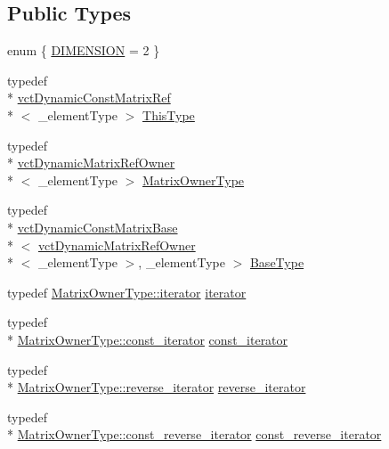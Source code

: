 \subsection*{Public Types}
\begin{DoxyCompactItemize}
\item 
enum \{ \hyperlink{classvct_dynamic_const_matrix_ref_a79a3214fbb027346f5ba60336c95c1faa078cb772f47aba74a3233d177914f8fa}{D\-I\-M\-E\-N\-S\-I\-O\-N} = 2
 \}
\item 
typedef \\*
\hyperlink{classvct_dynamic_const_matrix_ref}{vct\-Dynamic\-Const\-Matrix\-Ref}\\*
$<$ \-\_\-element\-Type $>$ \hyperlink{classvct_dynamic_const_matrix_ref_a9c784be5ec51408ff2830ef67f2c01c8}{This\-Type}
\item 
typedef \\*
\hyperlink{classvct_dynamic_matrix_ref_owner}{vct\-Dynamic\-Matrix\-Ref\-Owner}\\*
$<$ \-\_\-element\-Type $>$ \hyperlink{classvct_dynamic_const_matrix_ref_a86a40c99d49dbdb2edd71bfb82ee105b}{Matrix\-Owner\-Type}
\item 
typedef \\*
\hyperlink{classvct_dynamic_const_matrix_base}{vct\-Dynamic\-Const\-Matrix\-Base}\\*
$<$ \hyperlink{classvct_dynamic_matrix_ref_owner}{vct\-Dynamic\-Matrix\-Ref\-Owner}\\*
$<$ \-\_\-element\-Type $>$, \-\_\-element\-Type $>$ \hyperlink{classvct_dynamic_const_matrix_ref_a0e57e53f6e3703384598d165b430f0e8}{Base\-Type}
\item 
typedef \hyperlink{classvct_dynamic_matrix_ref_owner_aaf9f6aaf86c05aec0bcd354d40c11863}{Matrix\-Owner\-Type\-::iterator} \hyperlink{classvct_dynamic_const_matrix_ref_ab330f3add78ec03ac1f50861ae7d12ac}{iterator}
\item 
typedef \\*
\hyperlink{classvct_dynamic_matrix_ref_owner_a7a8df19473cc2e95e25c4d1bf4bacbe4}{Matrix\-Owner\-Type\-::const\-\_\-iterator} \hyperlink{classvct_dynamic_const_matrix_ref_ad5222f7776fb22e1fbf36980d1b2022b}{const\-\_\-iterator}
\item 
typedef \\*
\hyperlink{classvct_dynamic_matrix_ref_owner_a133b22e9f6b4e7a20998ad3db72ed6c3}{Matrix\-Owner\-Type\-::reverse\-\_\-iterator} \hyperlink{classvct_dynamic_const_matrix_ref_a05e475dde6f7edcd23536c620da182db}{reverse\-\_\-iterator}
\item 
typedef \\*
\hyperlink{classvct_dynamic_matrix_ref_owner_a50c3b985899b0d6cb2f9fab9f8305207}{Matrix\-Owner\-Type\-::const\-\_\-reverse\-\_\-iterator} \hyperlink{classvct_dynamic_const_matrix_ref_aab47ab9afbf2163300fb700fa5240550}{const\-\_\-reverse\-\_\-iterator}
\end{DoxyCompactItemize}

